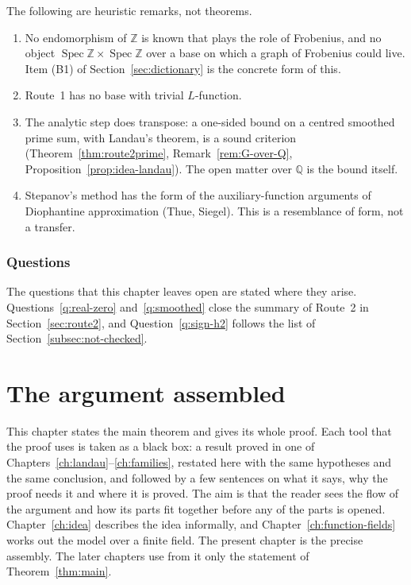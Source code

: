\documentclass[11pt]{amsbook}
\theoremstyle{plain}
\theoremstyle{definition}
\theoremstyle{remark}
\numberwithin{equation}{section}
\numberwithin{figure}{chapter}
\numberwithin{table}{chapter}
\newcommand{\Q}{\mathbb{Q}}
\newcommand{\Z}{\mathbb{Z}}
\DeclareMathOperator{\Spec}{Spec}
\begin{document}
The following are heuristic remarks, not theorems.
\begin{enumerate}[label=(\alph*)]
\item No endomorphism of $\Z$ is known that plays the role of
Frobenius, and no object $\Spec\Z\times\Spec\Z$ over a base on
which a graph of Frobenius could live. Item (B1) of
Section~\ref{sec:dictionary} is the concrete form of this.
\item Route~1 has no base with trivial $L$-function.
\item The analytic step does transpose: a one-sided bound on a
centred smoothed prime sum, with Landau's theorem, is a sound
criterion (Theorem~\ref{thm:route2prime},
Remark~\ref{rem:G-over-Q}, Proposition~\ref{prop:idea-landau}). The
open matter over $\Q$ is the bound itself.
\item Stepanov's method has the form of the auxiliary-function
arguments of Diophantine approximation (Thue, Siegel). This is a
resemblance of form, not a transfer.
\end{enumerate}

\subsection{Questions}

The questions that this chapter leaves open are stated where they
arise. Questions~\ref{q:real-zero} and~\ref{q:smoothed} close the
summary of Route~2 in Section~\ref{sec:route2}, and
Question~\ref{q:sign-h2} follows the list of
Section~\ref{subsec:not-checked}.
\clearpage
\clearpage
\chapter{The argument assembled}
\label{ch:assembly}

This chapter states the main theorem and gives its whole proof. Each
tool that the proof uses is taken as a black box: a result proved in
one of Chapters~\ref{ch:landau}--\ref{ch:families}, restated here
with the same hypotheses and the same conclusion, and followed by a
few sentences on what it says, why the proof needs it and where it is
proved. The aim is that the reader sees the flow of the argument and
how its parts fit together before any of the parts is opened.
Chapter~\ref{ch:idea} describes the idea informally, and
Chapter~\ref{ch:function-fields} works out the model over a finite
field. The present chapter is the precise assembly. The later
chapters use from it only the statement of Theorem~\ref{thm:main}.
\end{document}
